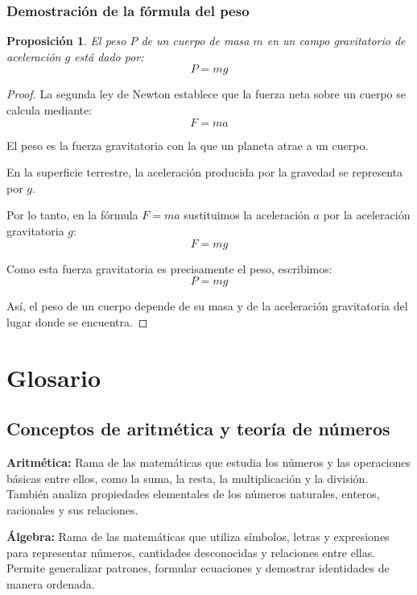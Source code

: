 \documentclass[12pt,final]{report}
\theoremstyle{plain}
\newtheorem{proposition}[theorem]{Proposición}
\theoremstyle{definition}
\begin{document}
\newpage

\subsection{Demostración de la fórmula del peso}

\begin{proposition}
El peso $P$ de un cuerpo de masa $m$ en un campo gravitatorio de aceleración $g$ está dado por:
\[
P = mg
\]
\end{proposition}

\begin{proof}

La segunda ley de Newton establece que la fuerza neta sobre un cuerpo se calcula mediante:
\[
F = ma
\]

El peso es la fuerza gravitatoria con la que un planeta atrae a un cuerpo.

En la superficie terrestre, la aceleración producida por la gravedad se representa por $g$.

Por lo tanto, en la fórmula $F=ma$ sustituimos la aceleración $a$ por la aceleración gravitatoria $g$:
\[
F = mg
\]

Como esta fuerza gravitatoria es precisamente el peso, escribimos:
\[
P = mg
\]

Así, el peso de un cuerpo depende de su masa y de la aceleración gravitatoria del lugar donde se encuentra.

\end{proof}




\newpage
\chapter*{Glosario}

\section*{Conceptos de aritmética y teoría de números}

\textbf{Aritmética:} Rama de las matemáticas que estudia los números y las operaciones básicas entre ellos, como la suma, la resta, la multiplicación y la división. También analiza propiedades elementales de los números naturales, enteros, racionales y sus relaciones.

\vspace{0.5em}

\textbf{Álgebra:} Rama de las matemáticas que utiliza símbolos, letras y expresiones para representar números, cantidades desconocidas y relaciones entre ellas. Permite generalizar patrones, formular ecuaciones y demostrar identidades de manera ordenada.
\end{document}
